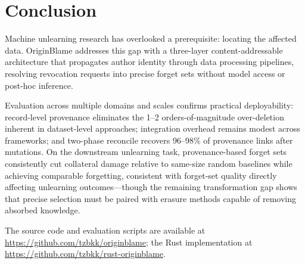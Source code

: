 \section{Conclusion}

Machine unlearning research has overlooked a prerequisite: locating the affected data. OriginBlame addresses this gap with a three-layer content-addressable architecture that propagates author identity through data processing pipelines, resolving revocation requests into precise forget sets without model access or post-hoc inference.

Evaluation across multiple domains and scales confirms practical deployability: record-level provenance eliminates the 1--2 orders-of-magnitude over-deletion inherent in dataset-level approaches; integration overhead remains modest across frameworks; and two-phase reconcile recovers 96--98\% of provenance links after mutations. On the downstream unlearning task, provenance-based forget sets consistently cut collateral damage relative to same-size random baselines while achieving comparable forgetting, consistent with forget-set quality directly affecting unlearning outcomes---though the remaining transformation gap shows that precise selection must be paired with erasure methods capable of removing absorbed knowledge.

The source code and evaluation scripts are available at \url{https://github.com/tzbkk/originblame}; the Rust implementation at \url{https://github.com/tzbkk/rust-originblame}.
